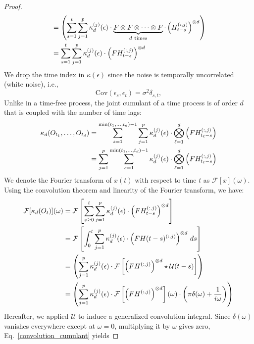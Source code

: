 \documentclass[10pt]{article}
\numberwithin{figure}{section}
\begin{document}
\begin{proof}
\begin{align}
     &=\left( \sum_{s=1}^{t} \sum_{j=1}^{p} \kappa_d^{(j)}(\epsilon)\cdot \underbrace{F \otimes F \otimes \cdots \otimes F}_{d~\text{times}} \cdot\left( H_{t-s}^{(:,j)} \right)^{\otimes d} \right) \notag\\
    &= \sum\limits_{s=1}^{t} \sum\limits_{j=1}^{p} \kappa_d^{(j)}(\epsilon) \cdot \left(F H_{t-s}^{(:,j)}\right)^{\otimes d}\label{sum_cumulant}
\end{align}
We drop the time index in $\kappa(\epsilon)$ since the noise is temporally uncorrelated (white noise), i.e.,
\[
\mathrm{Cov}(\epsilon_s, \epsilon_t) = \sigma^2 \delta_{s,t},
\]
Unlike in a time-free process, the joint cumulant of a time process is of order $d$ that is coupled with the number of time lags:
\begin{align}
\kappa_d(O_{t_1}, \dots, O_{t_d}) 
&= \sum_{s=1}^{\min(t_1, \dots, t_d) - 1} 
\sum_{j=1}^{p} 
 \kappa_d^{(j)}(\epsilon) \cdot 
\bigotimes_{\ell=1}^{d} \left( F H_{t_\ell - s}^{(:,j)} \right) \notag\\
&=
\sum_{j=1}^{p} 
 \sum_{s=1}^{\min(t_1, \dots, t_d) - 1} \kappa_d^{(j)}(\epsilon) \cdot 
\bigotimes_{\ell=1}^{d} \left( F H_{t_\ell - s}^{(:,j)} \right)\label{CP-decomposition}
\end{align}
We denote the Fourier transform of \( x(t) \) with respect to time \( t \) as \( \mathcal{F}[x](\omega) \). Using the convolution theorem and linearity of the Fourier transform, we have:
\begin{align}
 \mathcal{F}[ \kappa_d(O_t)](\omega)&=\mathcal{F}\left[ \sum\limits_{s\ge 0}^{t} \sum\limits_{j=1}^{p} \kappa_d^{(j)}(\epsilon) \cdot \left(F H_{t-s}^{(:,j)}\right)^{\otimes d}\right] \notag\\
 &=  \mathcal{F}\left[\int_0^{t} \sum_{j=1}^p \kappa_d^{(j)}(\epsilon) \cdot \left( F H(t-s)^{(:,j)} \right)^{\otimes d} \, ds\right] \notag\\
 & = \left( \sum_{j=1}^p \kappa_d^{(j)}(\epsilon) \cdot \mathcal{F}\left[ \left( F H^{(:,j)} \right)^{\otimes d} \star \mathcal{U}(t-s)\right]\right)
\notag\\
& = \left( \sum_{j=1}^p \kappa_d^{(j)}(\epsilon) \cdot \mathcal{F}\left[ \left( F H^{(:,j)} \right)^{\otimes d}\right](\omega) \cdot \left( \pi \delta(\omega) + \frac{1}{i \omega} \right)\right )
 \label{convolution_cumulant}
\end{align}
Hereafter, we applied $\mathcal{U}$ to induce a generalized convolution integral.
Since $\delta(\omega)$ vanishes everywhere except at $ \omega=0$, multiplying it by $\omega$ gives zero, Eq.~\eqref{convolution_cumulant} yields

\end{proof}
\end{document}
